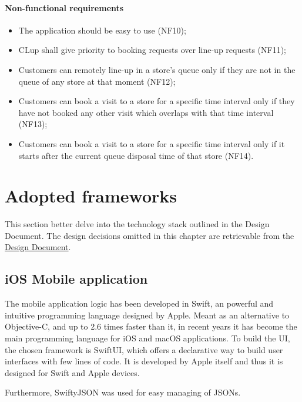 \documentclass[a4paper,oneside,11pt]{book}
\begin{document}
    \subsubsection{Non-functional requirements}
    \begin{itemize}
        \item The application should be easy to use (NF10);
        \item CLup shall give priority to booking requests over line-up requests (NF11);
        \item Customers can remotely line-up in a store’s queue only if they are not in the queue of any store at that moment (NF12);
        \item Customers can book a visit to a store for a specific time interval only if they have not booked any other visit which overlaps with that time interval (NF13);
        \item Customers can book a visit to a store for a specific time interval only if it starts after the current queue disposal time of that store (NF14).
    \end{itemize}
    
\chapter{Adopted frameworks}
    This section better delve into the technology stack outlined in the Design Document. The design decisions omitted in this chapter are retrievable from the  \href{run:../DeliveryFolder/DD2.pdf}{Design Document}.
    \section{iOS Mobile application}
    The mobile application logic has been developed in Swift, an powerful and intuitive programming language designed by Apple. Meant as an alternative to Objective-C, and up to 2.6 times faster than it, in recent years it has become the main programming language for iOS and macOS applications. To build the UI, the chosen framework is SwiftUI, which offers a declarative way to build user interfaces with few lines of code. It is developed by Apple itself and thus it is designed for Swift and Apple devices. \par
    Furthermore, SwiftyJSON was used for easy managing of JSONs.
    
\end{document}
